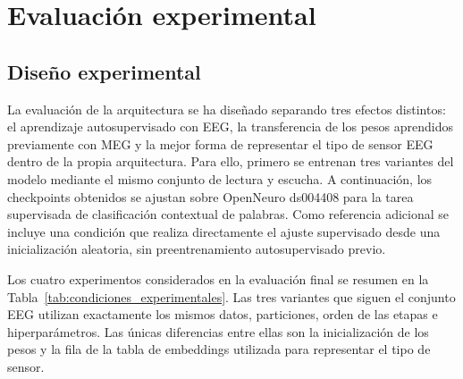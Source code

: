 
\chapter{Evaluación experimental}

\providecommand{\celdaresultado}{\phantom{00,000}}

\section{Diseño experimental}


La evaluación de la arquitectura se ha diseñado separando tres efectos distintos: el aprendizaje autosupervisado con EEG, la transferencia de los pesos aprendidos previamente con MEG y la mejor forma de representar el tipo de sensor EEG dentro de la propia arquitectura. Para ello, primero se entrenan tres variantes del modelo mediante el mismo conjunto de lectura y escucha. A continuación, los checkpoints obtenidos se ajustan sobre OpenNeuro ds004408 para la tarea supervisada de clasificación contextual de palabras. Como referencia adicional se incluye una condición que realiza directamente el ajuste supervisado desde una inicialización aleatoria, sin preentrenamiento autosupervisado previo.

Los cuatro experimentos considerados en la evaluación final se resumen en la Tabla~\ref{tab:condiciones_experimentales}. Las tres variantes que siguen el conjunto EEG utilizan exactamente los mismos datos, particiones, orden de las etapas e hiperparámetros. Las únicas diferencias entre ellas son la inicialización de los pesos y la fila de la tabla de embeddings utilizada para representar el tipo de sensor.

